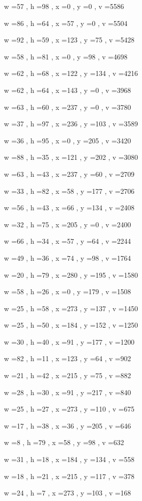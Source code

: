 \documentclass[11pt]{article}
\begin{document}
w =57 , h =98 , x =0 , y =0 , v =5586
\par
w =86 , h =64 , x =57 , y =0 , v =5504
\par
w =92 , h =59 , x =123 , y =75 , v =5428
\par
w =58 , h =81 , x =0 , y =98 , v =4698
\par
w =62 , h =68 , x =122 , y =134 , v =4216
\par
w =62 , h =64 , x =143 , y =0 , v =3968
\par
w =63 , h =60 , x =237 , y =0 , v =3780
\par
w =37 , h =97 , x =236 , y =103 , v =3589
\par
w =36 , h =95 , x =0 , y =205 , v =3420
\par
w =88 , h =35 , x =121 , y =202 , v =3080
\par
w =63 , h =43 , x =237 , y =60 , v =2709
\par
w =33 , h =82 , x =58 , y =177 , v =2706
\par
w =56 , h =43 , x =66 , y =134 , v =2408
\par
w =32 , h =75 , x =205 , y =0 , v =2400
\par
w =66 , h =34 , x =57 , y =64 , v =2244
\par
w =49 , h =36 , x =74 , y =98 , v =1764
\par
w =20 , h =79 , x =280 , y =195 , v =1580
\par
w =58 , h =26 , x =0 , y =179 , v =1508
\par
w =25 , h =58 , x =273 , y =137 , v =1450
\par
w =25 , h =50 , x =184 , y =152 , v =1250
\par
w =30 , h =40 , x =91 , y =177 , v =1200
\par
w =82 , h =11 , x =123 , y =64 , v =902
\par
w =21 , h =42 , x =215 , y =75 , v =882
\par
w =28 , h =30 , x =91 , y =217 , v =840
\par
w =25 , h =27 , x =273 , y =110 , v =675
\par
w =17 , h =38 , x =36 , y =205 , v =646
\par
w =8 , h =79 , x =58 , y =98 , v =632
\par
w =31 , h =18 , x =184 , y =134 , v =558
\par
w =18 , h =21 , x =215 , y =117 , v =378
\par
w =24 , h =7 , x =273 , y =103 , v =168
\par
\newpage
\end{document}
